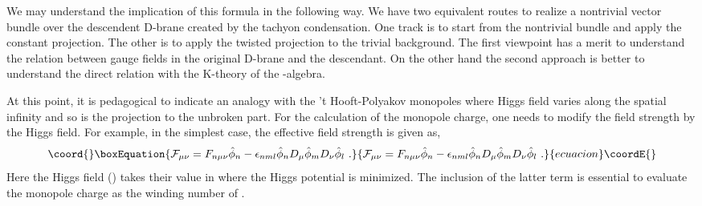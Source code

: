 \documentclass[a4paper,12pt]{article}
\begin{document}
We may understand the implication of this formula
in the following way. We have two equivalent routes
to realize a nontrivial vector bundle over the 
descendent D-brane created by the tachyon condensation.  
One track is to start
from the nontrivial \coordHE{} bundle and apply the constant projection.
The other is to apply the twisted projection to the trivial 
\coordHE{} background.
The first viewpoint has a merit to understand
the relation between gauge fields in the original
D-brane and the descendant.
On the other hand the second approach is better
to understand the direct relation with the 
K-theory of the \coordHE{}-algebra.



At this point, it is pedagogical to
indicate an analogy with the 't Hooft-Polyakov monopoles 
\cite{r:monopole} where Higgs field varies along the spatial infinity
and so is the projection to the unbroken \coordHE{} part.
For the calculation of the monopole charge, one needs to modify
the \coordHE{} field strength by the Higgs field.  For example,
in the simplest \coordHE{} case, the effective
field strength is given as,
\begin{equation}\coord{}\boxEquation{
 \cF_{\mu\nu} = F_{n\mu\nu} \hat\phi_n - \epsilon_{nml}
\hat\phi_n D_\mu \hat\phi_m D_\nu \hat\phi_l\,\,.
}{
 \cF_{\mu\nu} = F_{n\mu\nu} \hat\phi_n - \epsilon_{nml}
\hat\phi_n D_\mu \hat\phi_m D_\nu \hat\phi_l\,\,.
}{ecuacion}\coordE{}\end{equation}
Here the Higgs field (\coordHE{}) takes their value in \coordHE{}
where the Higgs potential is minimized. 
The inclusion of the latter term is essential to
evaluate the monopole charge as the
winding number of \coordHE{}.
\end{document}
